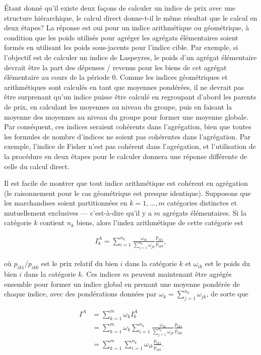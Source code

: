 \documentclass[]{article}
\begin{document}
Étant donné qu'il existe deux façons de calculer un indice de prix avec une structure hiérarchique, le calcul direct donne-t-il le même résultat que le calcul en deux étapes? La réponse est oui pour un indice arithmétique ou géométrique, à condition que les poids utilisés pour agréger les agrégats élémentaires soient formés en utilisant les poids sous-jacents pour l'indice cible. Par exemple, si l'objectif est de calculer un indice de Laspeyres, le poids d'un agrégat élémentaire devrait être la part des dépenses / revenus pour les biens de cet agrégat élémentaire au cours de la période 0. Comme les indices géométriques et arithmétiques sont calculés en tant que moyennes pondérées, il ne devrait pas être surprenant qu'un indice puisse être calculé en regroupant d'abord les parents de prix, en calculant les moyennes au niveau du groupe, puis en faisant la moyenne des moyennes au niveau du groupe pour former une moyenne globale. Par conséquent, ces indices seraient cohérents dans l'agrégation, bien que toutes les formules de nombre d'indices ne soient pas cohérentes dans l'agrégation. Par exemple, l'indice de Fisher n'est pas cohérent dans l'agrégation, et l'utilisation de la procédure en deux étapes pour le calculer donnera une réponse différente de celle du calcul direct.

Il est facile de montrer que tout indice arithmétique est cohérent en agrégation (le raisonnement pour le cas géométrique est presque identique). Supposons que les marchandises soient partitionnées en \(k = 1, \ldots, m\) catégories distinctes et mutuellement exclusives --- c'est-à-dire qu'il y a \(m\) agrégats élémentaires. Si la catégorie \(k\) contient \(n_{k}\) biens, alors l'index arithmétique de cette catégorie est

\begin{align*}
I_{k}^{A} = \sum_{i = 1}^{n_k} \frac{\omega_{ik}}{\sum_{j = 1}^{n_k} \omega_{jk}} \frac{p_{ik1}}{p_{ik0}},
\end{align*}

où \(p_{ik1} / p_{ik0}\) est le prix relatif du bien \(i\) dans la catégorie \(k\) et \(\omega_{ik}\) est le poids du bien \(i\) dans la catégorie \(k\). Ces indices \(m\) peuvent maintenant être agrégés ensemble pour former un indice global en prenant une moyenne pondérée de chaque indice, avec des pondérations données par \(\omega_{k} = \sum_{j = 1}^{n_k} \omega_{jk}\), de sorte que

\begin{align*}
I^{A} &= \sum_{k = 1}^{m} \omega_k I_{k}^{A} \\
&= \sum_{k = 1}^{m} \omega_k \sum_{i = 1}^{n_k} \frac{\omega_{ik}}{\sum_{j = 1}^{n_k} \omega_{jk}} \frac{p_{ik1}}{p_{ik0}} \\
&= \sum_{k = 1}^{m} \sum_{i = 1}^{n_k} \omega_{ik} \frac{p_{ik1}}{p_{ik0}}.
\end{align*}
\end{document}
